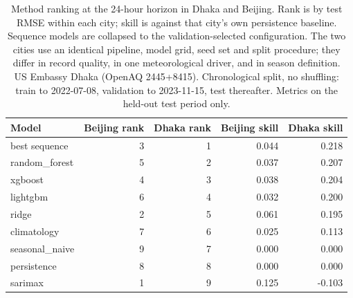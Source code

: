 \begin{table}[htbp]
\caption{Method ranking at the 24-hour horizon in Dhaka and Beijing. Rank is by test RMSE within each city; skill is against that city's own persistence baseline. Sequence models are collapsed to the validation-selected configuration. The two cities use an identical pipeline, model grid, seed set and split procedure; they differ in record quality, in one meteorological driver, and in season definition. US Embassy Dhaka (OpenAQ 2445+8415). Chronological split, no shuffling: train to 2022-07-08, validation to 2023-11-15, test thereafter. Metrics on the held-out test period only.}
\label{tab:cross_city_comparison}
\begin{tabular}{lrrrr}
\toprule
Model & Beijing rank & Dhaka rank & Beijing skill & Dhaka skill \\
\midrule
best sequence & 3 & 1 & 0.044 & 0.218 \\
random\_forest & 5 & 2 & 0.037 & 0.207 \\
xgboost & 4 & 3 & 0.038 & 0.204 \\
lightgbm & 6 & 4 & 0.032 & 0.200 \\
ridge & 2 & 5 & 0.061 & 0.195 \\
climatology & 7 & 6 & 0.025 & 0.113 \\
seasonal\_naive & 9 & 7 & 0.000 & 0.000 \\
persistence & 8 & 8 & 0.000 & 0.000 \\
sarimax & 1 & 9 & 0.125 & -0.103 \\
\bottomrule
\end{tabular}
\end{table}
